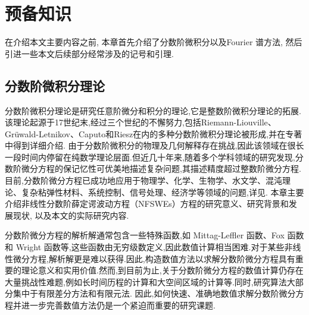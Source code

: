 \chapter[预备知识]{预备知识}

在介绍本文主要内容之前, 本章首先介绍了分数阶微积分以及Fourier 谱方法, 
然后引进一些本文后续部分经常涉及的记号和引理.


\section{分数阶微积分理论}
分数阶微积分理论是研究任意阶微分和积分的理论,它是整数阶微积分理论的拓展.该理论起源于17世纪末,经过三个世纪的不懈努力,包括Riemann-Liouville、Grüwald-Letnikov、Caputo和Riesz在内的多种分数阶微积分理论被形成,并在专著\cite{samkoFractionalIntegralsDerivatives1993}中得到详细介绍.
由于分数阶微积分的物理及几何解释存在挑战,因此该领域在很长一段时间内停留在纯数学理论层面.但近几十年来,随着多个学科领域的研究发现,分数阶微分方程的保记忆性可优美地描述复杂问题,其描述精度超过整数阶微分方程.目前,分数阶微分方程已成功地应用于物理学、化学、生物学、水文学、混沌理论、复杂粘弹性材料、系统控制、信号处理、经济学等领域的问题,详见\cite{liIntroductionFractionalCalculus2015,HandbookDifferentialEquations2008,brychkovIndefiniteIntegrals2008,zhangMassBalanceBased2005,carrerasAnomalousDiffusionExit2001,hilferFRACTIONALCALCULUSREGULAR2000,liangRobustnessFractionalorderBoundary2007,maginSolvingFractionalOrder2009,zaslavskySelfsimilarTransportIncomplete1993,sunRandomorderFractionalDifferential2011}.
本章主要介绍非线性分数阶薛定谔波动方程（NFSWEs）方程的研究意义、研究背景和发展现状, 以及本文的实际研究内容.

分数阶微分方程的解析解通常包含一些特殊函数,如 Mittag-Leffler 函数、Fox 函数和 Wright 函数等,这些函数由无穷级数定义,因此数值计算相当困难.对于某些非线性微分方程,解析解更是难以获得.因此,构造数值方法以求解分数阶微分方程具有重要的理论意义和实用价值.然而,到目前为止,关于分数阶微分方程的数值计算仍存在大量挑战性难题,例如长时间历程的计算和大空间区域的计算等.同时,研究算法大部分集中于有限差分方法和有限元法.
因此,如何快速、准确地数值求解分数阶微分方程并进一步完善数值方法仍是一个紧迫而重要的研究课题.

